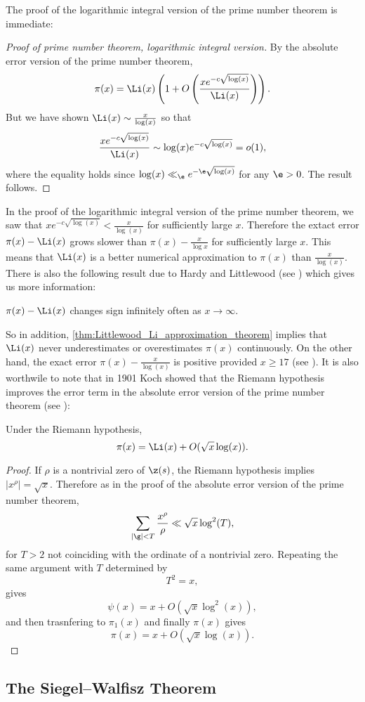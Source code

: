       The proof of the logarithmic integral version of the prime number theorem is immediate:

      \begin{proof}[Proof of prime number theorem, logarithmic integral version]
        By the absolute error version of the prime number theorem,
        \[
          \pi(x) = \Li(x)\left(1+O\left(\frac{xe^{-c\sqrt{\log(x)}}}{\Li(x)}\right)\right).
        \]
        But we have shown $\Li(x) \sim \frac{x}{\log(x)}$ so that
        \[
          \frac{xe^{-c\sqrt{\log(x)}}}{\Li(x)} \sim \log(x)e^{-c\sqrt{\log(x)}} = o(1),
        \]
        where the equality holds since $\log(x) \ll_{\e} e^{-\e\sqrt{\log(x)}}$ for any $\e > 0$. The result follows.
      \end{proof}
      
      In the proof of the logarithmic integral version of the prime number theorem, we saw that $xe^{-c\sqrt{\log(x)}} < \frac{x}{\log(x)}$ for sufficiently large $x$. Therefore the extact error $\pi(x)-\Li(x)$ grows slower than $\pi(x)-\frac{x}{\log{x}}$ for sufficiently large $x$. This means that $\Li(x)$ is a better numerical approximation to $\pi(x)$ than $\frac{x}{\log(x)}$. There is also the following result due to Hardy and Littlewood (see \cite{hardy1916contributions}) which gives us more information:

      \begin{proposition}\label{thm:Littlewood_Li_approximation_theorem}
        $\pi(x)-\Li(x)$ changes sign infinitely often as $x \to \infty$.
      \end{proposition}

      So in addition, \cref{thm:Littlewood_Li_approximation_theorem} implies that $\Li(x)$ never underestimates or overestimates $\pi(x)$ continuously. On the other hand, the exact error $\pi(x)-\frac{x}{\log(x)}$ is positive provided $x \ge 17$ (see \cite{rosser1962approximate}). It is also worthwile to note that in 1901 Koch showed that the Riemann hypothesis improves the error term in the absolute error version of the prime number theorem (see \cite{von1901distribution}):

      \begin{proposition}
        Under the Riemann hypothesis,
        \[
          \pi(x) = \Li(x)+O(\sqrt{x}\log(x)).
        \]
      \end{proposition}
      \begin{proof}
        If $\rho$ is a nontrivial zero of $\z(s)$, the Riemann hypothesis implies $|x^{\rho}| = \sqrt{x}$. Therefore as in the proof of the absolute error version of the prime number theorem,
        \[
          \sum_{|\g| < T}\frac{x^{\rho}}{\rho} \ll \sqrt{x}\log^{2}(T),
        \]
        for $T > 2$ not coinciding with the ordinate of a nontrivial zero. Repeating the same argument with $T$ determined by
        \[
          T^{2} = x,
        \]
        gives
        \[
          \psi(x) = x+O(\sqrt{x}\log^{2}(x)),
        \]
        and then trasnfering to $\pi_{1}(x)$ and finally $\pi(x)$ gives
        \[
          \pi(x) = x+O(\sqrt{x}\log(x)).
        \]
      \end{proof}
    \subsection*{The Siegel–Walfisz Theorem}